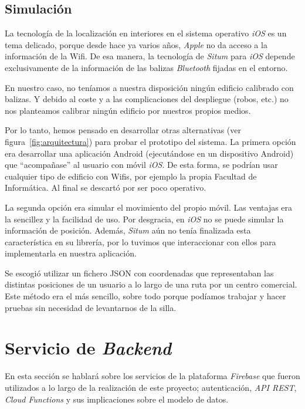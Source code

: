 \subsection{Simulación\label{sec:simul_subsec}}

La tecnología de la localización en interiores en el sistema operativo \emph{iOS} es un tema delicado, porque desde hace ya varios años, \emph{Apple} no da acceso a la información de la Wifi. De esa manera, la tecnología de \emph{Situm} para \emph{iOS} depende exclusivamente de la información de las balizas \emph{Bluetooth} fijadas en el entorno.

En nuestro caso, no teníamos a nuestra disposición ningún edificio calibrado con balizas. Y debido al coste y a las complicaciones del despliegue (robos, etc.) no nos planteamos calibrar ningún edificio por nuestros propios medios.

Por lo tanto, hemos pensado en desarrollar otras alternativas (ver figura~\ref{fig:arquitectura}) para probar el prototipo del sistema. 
La primera opción era desarrollar una aplicación Android (ejecutándose en un dispositivo Android) que ``acompañase'' al usuario con móvil \emph{iOS}. De esta forma, se podrían usar cualquier tipo de edificio con Wifis, por ejemplo la propia Facultad de Informática. 
Al final se descartó por ser poco operativo.

La segunda opción era simular el movimiento del propio móvil.
Las ventajas era la sencillez y la facilidad de uso.
Por desgracia, en \emph{iOS} no se puede simular la información de posición. Además, \emph{Situm} aún no tenía finalizada esta característica en su librería, por lo tuvimos que interaccionar con ellos para implementarla en nuestra aplicación.

Se escogió utilizar un fichero JSON con coordenadas que representaban las distintas posiciones de un usuario a lo largo de una ruta por un centro comercial. Este método era el más sencillo, sobre todo porque podíamos trabajar y hacer pruebas sin necesidad de levantarnos de la silla.


\section{Servicio de \textit{Backend}}
En esta sección se hablará sobre los servicios de la plataforma \textit{Firebase} que fueron utilizados a lo largo de la realización de este proyecto; autenticación, \textit{API REST}, \textit{Cloud Functions} y sus implicaciones sobre el modelo de datos.

